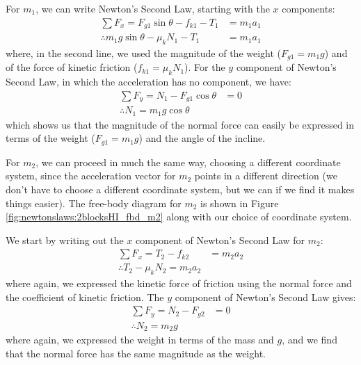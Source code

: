 \begin{example}

For $m_1$, we can write Newton's Second Law, starting with the $x$ components:
\begin{align*}
\sum F_x = F_{g1}\sin\theta-f_{k1}-T_1&=m_1a_1\\
\therefore m_1 g\sin\theta -\mu_k N_1 - T_1 &= m_1 a_1
\end{align*}
where, in the second line, we used the magnitude of the weight ($F_{g1}=m_1g$) and of the force of kinetic friction ($f_{k1}=\mu_kN_1$). For the $y$ component of Newton's Second Law, in which the acceleration has no component, we have:
\begin{align*}
\sum F_y = N_1 - F_{g1}\cos\theta &= 0\\
\therefore N_1=m_1g\cos\theta
\end{align*}
which shows us that the magnitude of the normal force can easily be expressed in terms of the weight ($F_{g1}=m_1g$) and the angle of the incline.

For $m_2$, we can proceed in much the same way, choosing a different coordinate system, since the acceleration vector for $m_2$ points in a different direction (we don't have to choose a different coordinate system, but we can if we find it makes things easier). The free-body diagram for $m_2$ is shown in Figure \ref{fig:newtonslaws:2blocksHI_fbd_m2} along with our choice of coordinate system.


We start by writing out the $x$ component of Newton's Second Law for $m_2$:
\begin{align*}
\sum F_x = T_2 - f_{k2} &= m_2 a_2\\
\therefore T_2 - \mu_k N_2 = m_2 a_2
\end{align*}
where again, we expressed the kinetic force of friction using the normal force and the coefficient of kinetic friction. The $y$ component of Newton's Second Law gives:
\begin{align*}
\sum F_y = N_2 - F_{g2} &=0\\
\therefore N_2 = m_2g
\end{align*}
where again, we expressed the weight in terms of the mass and $g$, and we find that the normal force has the same magnitude as the weight. 


\end{example}
